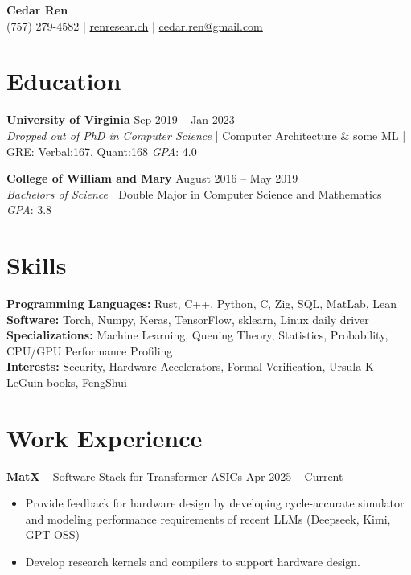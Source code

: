 \documentclass[10pt,letterpaper]{article}
\begin{document}
\begin{center}
    {\Large \textbf{Cedar Ren}} \\
    (757) 279-4582 \hspace{0.3cm} | \hspace{0.3cm} \href{https://renresear.ch}{renresear.ch} \hspace{0.3cm} | \hspace{0.3cm} \href{mailto:cedar.ren@gmail.com}{cedar.ren@gmail.com}
\end{center}

\section{Education}

\textbf{University of Virginia} \hfill Sep 2019 -- Jan 2023 \\
\textit{Dropped out of PhD in Computer Science} | Computer Architecture \& some ML | GRE: Verbal:167, Quant:168 \hfill \textit{GPA}: 4.0

\textbf{College of William and Mary} \hfill August 2016 -- May 2019 \\
\textit{Bachelors of Science} | Double Major in Computer Science and Mathematics \hfill \textit{GPA}: 3.8

\section{Skills}

\textbf{Programming Languages:} Rust, C++, Python, C, Zig, SQL, MatLab, Lean \\
\textbf{Software:} Torch, Numpy, Keras, TensorFlow, sklearn, Linux daily driver \\
\textbf{Specializations:} Machine Learning, Queuing Theory, Statistics, Probability, CPU/GPU Performance Profiling \\
\textbf{Interests:} Security, Hardware Accelerators, Formal Verification, Ursula K LeGuin books, FengShui

\section{Work Experience}

\vspace{3pt}
\textbf{MatX} -- Software Stack for Transformer ASICs \hfill Apr 2025 -- Current
\begin{itemize}
    \item Provide feedback for hardware design by developing cycle-accurate simulator and modeling performance requirements of recent LLMs (Deepseek, Kimi, GPT-OSS)
    \item Develop research kernels and compilers to support hardware design.
\end{itemize}
\end{document}
